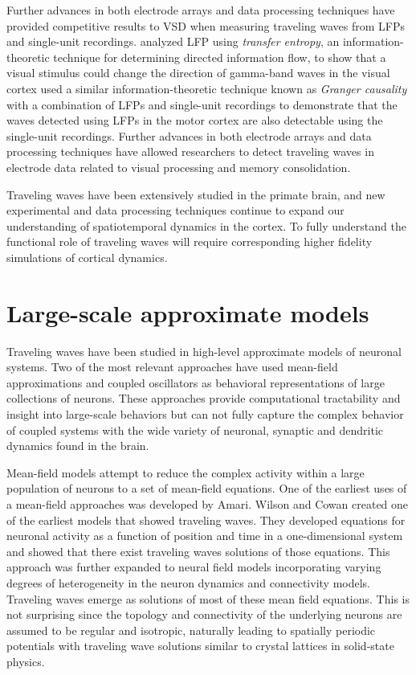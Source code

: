 Further advances in both electrode arrays and data processing techniques have provided competitive results to 
VSD when measuring traveling waves from LFPs and single-unit recordings.
\citet{Besserve2015} analyzed LFP using \textit{transfer entropy}, an information-theoretic technique for determining directed information flow,
to show that a visual stimulus could change the direction of gamma-band waves in the visual cortex
\citet{Takahashi2015} used a similar information-theoretic technique known as \textit{Granger causality} with a combination of LFPs and single-unit recordings
to demonstrate that the waves detected using LFPs in the motor cortex are also detectable using the single-unit recordings.
Further advances in both electrode arrays\citep{Maynard1997} and data processing techniques\citep{Muller2016} have allowed researchers to detect traveling waves in electrode data 
related to visual processing\citep{Davis2020} and memory consolidation\citep{Dickey2021}.

Traveling waves have been extensively studied in the primate brain, and new experimental and data processing techniques 
continue to expand our understanding of spatiotemporal dynamics in the cortex.
To fully understand the functional role of traveling waves will require corresponding higher fidelity simulations of cortical dynamics.

\section{Large-scale approximate models}
Traveling waves have been studied in high-level approximate models of neuronal systems.
Two of the most relevant approaches have used mean-field approximations and coupled oscillators as behavioral representations of large collections of neurons.
These approaches provide computational tractability and insight into large-scale behaviors but can not fully capture the complex behavior of coupled systems with the wide variety of neuronal, 
synaptic and dendritic dynamics found in the brain.

Mean-field models attempt to reduce the complex activity within a large population of neurons to a set of mean-field equations.
One of the earliest uses of a mean-field approaches was developed by Amari\citep{Amari1972}\citep{Amari1977}.
Wilson and Cowan\citep{Wilson1973} created one of the earliest models that showed traveling waves. 
They developed equations for neuronal activity as a function of position and time in a one-dimensional system and showed that there exist traveling waves solutions of those equations.
This approach was further expanded \citep{Ermentrout1979}\citep{Sompolinsky1988}\citep{Vreeswijk1998}\citep{Faugeras2009}\citep{Zhang2016} to neural field models incorporating 
varying degrees of heterogeneity in the neuron dynamics and connectivity models.
Traveling waves emerge as solutions of most of these mean field equations.
This is not surprising since the topology and connectivity of the underlying neurons are assumed to be regular and isotropic, naturally leading to 
spatially periodic potentials with traveling wave solutions similar to crystal lattices in solid-state physics.

